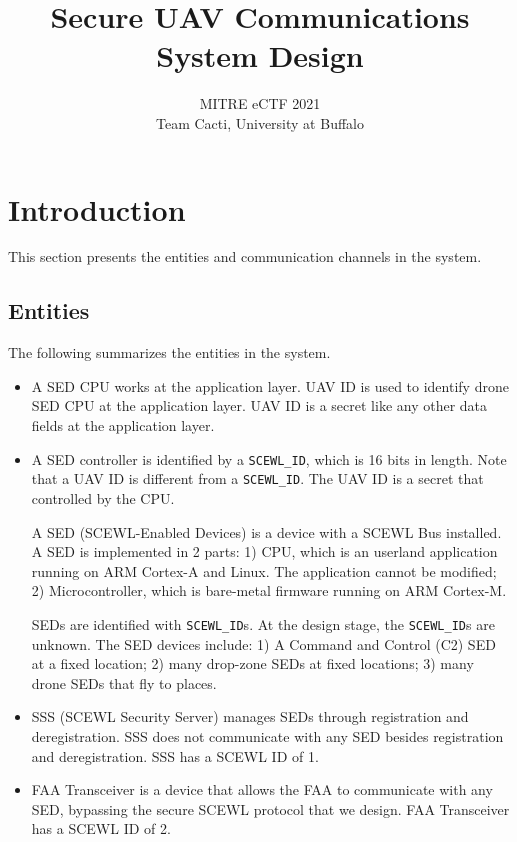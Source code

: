 \documentclass[11pt,oneside,onecolumn,letterpaper]{article}
\title{Secure UAV Communications System Design}
\author{MITRE eCTF 2021\\Team Cacti, University at Buffalo}
\date{}
\begin{document}
\normalsize


\maketitle

\renewcommand{\thepage}{System Design, Team Cacti, University at Buffalo--\arabic{page}}
\setcounter{page}{1} \normalsize
%

\newcommand{\flagRollback}{\textsf{Rollback}\xspace}

\section{Introduction}

This section presents the entities and communication channels in the system.

\subsection{Entities}

The following summarizes the entities in the system.

\begin{itemize}
	\item A SED CPU works at the application layer. UAV ID is used to identify drone SED CPU at the application layer. UAV ID is a secret like any other data fields at the application layer.
	
	\item A SED controller is identified by a \verb|SCEWL_ID|, which is 16 bits in length. Note that a UAV ID is different from a \verb|SCEWL_ID|. The UAV ID is a secret that controlled by the CPU.

A SED (SCEWL-Enabled Devices) is a device with a SCEWL Bus installed. 
A SED is implemented in 2 parts: 1) CPU, which is an userland application running on  ARM Cortex-A and Linux. The application cannot be modified; 2) 
Microcontroller, which is bare-metal firmware running on ARM Cortex-M. 
	
SEDs are identified with \verb|SCEWL_ID|s. At the design stage, the \verb|SCEWL_ID|s are unknown. The SED devices include: 
1) A Command and Control (C2) SED at a fixed location; 
2) many drop-zone SEDs at fixed locations; 
3) many drone SEDs that fly to places.
	
	\item SSS (SCEWL Security Server) manages SEDs through registration
and deregistration. SSS does not communicate with any SED besides registration
and deregistration. SSS has a SCEWL ID of 1.
	
	\item FAA Transceiver is a device that allows the FAA to communicate with any SED, bypassing the secure SCEWL protocol that we design. FAA Transceiver has a SCEWL ID of 2.
\end{itemize}
\end{document}
